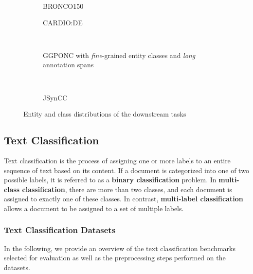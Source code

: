 \begin{figure}[htbp]
    \centering
    \begin{subfigure}{0.49\textwidth}
        \centering
        
        \caption{BRONCO150}
    \end{subfigure}
    \hfill
    \begin{subfigure}{0.49\textwidth}
        \centering
        
        \caption{CARDIO:DE}
    \end{subfigure} 
    \\[\baselineskip]
    \begin{subfigure}{0.8\textwidth}
        \centering
        
        \caption{GGPONC with \textit{fine}-grained entity classes and
        \textit{long} annotation spans}
    \end{subfigure}
    \\[\baselineskip] 
    \begin{subfigure}{0.8\textwidth}
        \centering
        
        \caption{JSynCC}
    \end{subfigure}
    \caption{Entity and class distributions of the downstream tasks}
    \label{fig:benchmark_stats}
\end{figure}

\subsection{Text Classification}

Text classification is the process of assigning one or more labels to an entire
sequence of text based on its content. If a document is categorized into one of
two possible labels, it is referred to as a \textbf{binary classification}
problem. In \textbf{multi-class classification}, there are more than two
classes, and each document is assigned to exactly one of these classes. In
contrast, \textbf{multi-label classification} allows a document to be assigned
to a set of multiple labels.

\subsubsection{Text Classification Datasets} \label{sec:cls_datasets}
In the following, we provide an overview of the text classification benchmarks
selected for evaluation as well as the preprocessing steps performed on the
datasets.

